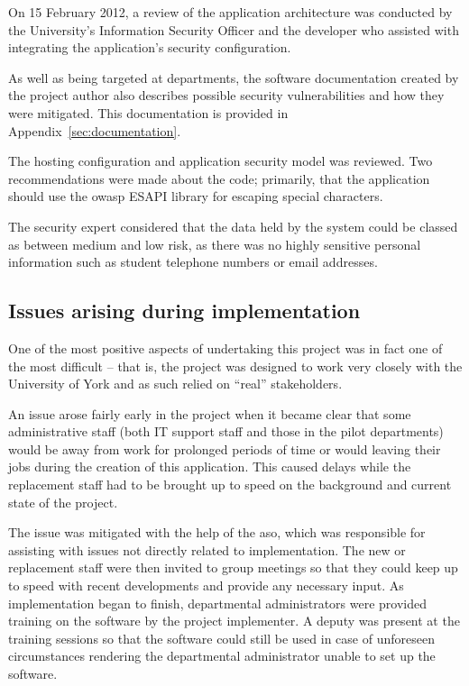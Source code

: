 \documentclass[draft]{scrartcl}
\begin{document}
On 15 February 2012, a review of the application architecture was conducted by
the University's Information Security Officer and the developer who assisted
with integrating the application's security configuration.

As well as being targeted at departments, the software documentation created
by the project author also describes possible security vulnerabilities and how
they were mitigated. This documentation is provided in
Appendix~\ref{sec:documentation}.

The hosting configuration and application security model was reviewed. Two
recommendations were made about the code; primarily, that the application should
use the \gls{owasp} ESAPI library for escaping special characters.

The security expert considered that the data held by the system could be
classed as between medium and low risk, as there was no highly sensitive
personal information such as student telephone numbers or email addresses.

\subsection{Issues arising during implementation}



One of the most positive aspects of undertaking this project was in fact one
of the most difficult -- that is, the project was designed to work very
closely with the University of York and as such relied on ``real''
stakeholders.

An issue arose fairly early in the project when it became clear that some
administrative staff (both IT support staff and those in the pilot
departments) would be away from work for prolonged periods of time or would
leaving their jobs during the creation of this application. This caused delays
while the replacement staff had to be brought up to speed on the background
and current state of the project.

The issue was mitigated with the help of the \gls{aso}, which was responsible
for assisting with issues not directly related to implementation. The new or
replacement staff were then invited to group meetings so that they could keep
up to speed with recent developments and provide any necessary input. As
implementation began to finish, departmental administrators were provided
training on the software by the project implementer. A deputy was present at
the training sessions so that the software could still be used in case of
unforeseen circumstances rendering the departmental administrator unable to
set up the software.
\end{document}
